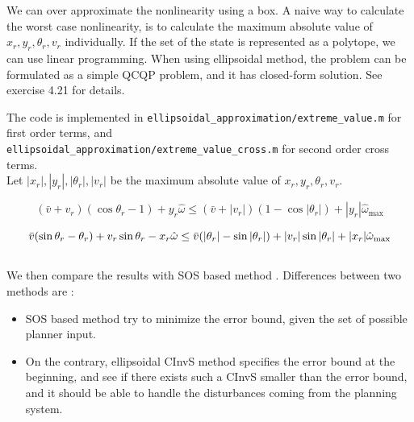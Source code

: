 \documentclass{article}
\begin{document}
We can over approximate the nonlinearity using a box. A naive way to calculate the worst case nonlinearity, is to calculate the maximum absolute value of $x_r, y_r, \theta_r, v_r$ individually. If the set of the state is represented as a polytope, we can use linear programming. When using ellipsoidal method, the problem can be formulated as a simple QCQP problem, and it has closed-form solution. See \cite{convexopti} exercise 4.21 for details. 

The code is implemented in \texttt{ellipsoidal\_approximation/extreme\_value.m} for first order terms, and\\ \texttt{ellipsoidal\_approximation/extreme\_value\_cross.m} for second order cross terms.
\\

Let $|x_r|, |y_r|, |\theta_r|, |v_r|$ be the maximum absolute value of $x_r, y_r, \theta_r, v_r$.

$$
(\bar{v} + v_r) (\cos\theta_r -1)+ y_r \hat{\omega} \leq (\bar{v} + |v_r|) (1-\cos|\theta_r|)+ |y_r| \hat{\omega}_{\max}
$$

$$
 \bar{v}( \sin\theta_r - \theta_r) + v_r\sin\theta_r - x_r \hat{\omega} \leq \bar{v}(|\theta_r| - \sin|\theta_r|) + |v_r|\sin|\theta_r| + |x_r| \hat{\omega}_{\max}\\
$$
\\
We then compare the results with SOS based method \cite{sos-tracking}. Differences between two methods are : 
\begin{itemize}
	\item SOS based method try to minimize the error bound, given the set of possible planner input. 
	\item On the contrary, ellipsoidal CInvS method specifies the error bound at the beginning, and see if there exists such a CInvS smaller than the error bound, and it should be able to handle the disturbances coming from the planning system. 
\end{itemize}
\end{document}
